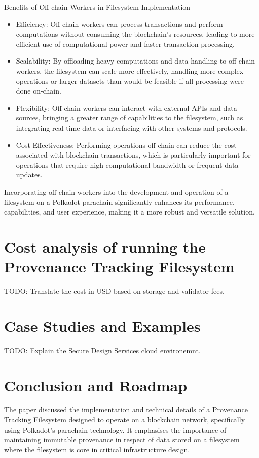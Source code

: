 \documentclass{tufte-handout}
\begin{document}
Benefits of Off-chain Workers in Filesystem Implementation
\begin{itemize}
  \item Efficiency: Off-chain workers can process transactions and perform computations without consuming the blockchain's resources,
  leading to more efficient use of computational power and faster transaction processing.
  \item Scalability: By offloading heavy computations and data handling to off-chain workers, the filesystem can scale more effectively,
  handling more complex operations or larger datasets than would be feasible if all processing were done on-chain.
  \item Flexibility: Off-chain workers can interact with external APIs and data sources, bringing a greater range of capabilities to the
  filesystem, such as integrating real-time data or interfacing with other systems and protocols.
  \item Cost-Effectiveness: Performing operations off-chain can reduce the cost associated with blockchain transactions, which is
  particularly important for operations that require high computational bandwidth or frequent data updates.
\end{itemize}
Incorporating off-chain workers into the development and operation of a filesystem on a Polkadot parachain significantly enhances its
performance, capabilities, and user experience, making it a more robust and versatile solution.

\section{Cost analysis of running the Provenance Tracking Filesystem}
TODO: Translate the cost in USD based on storage and validator fees.
\section{Case Studies and Examples}
TODO: Explain the Secure Design Services cloud environemnt.
\section{Conclusion and Roadmap}
The paper discussed the implementation and technical details of a Provenance Tracking Filesystem designed to operate on a blockchain network, specifically
using Polkadot's parachain technology. It emphasises the importance of maintaining immutable provenance in respect of data stored on a filesystem where the
filesystem is core in critical infrastructure design.



\end{document}
